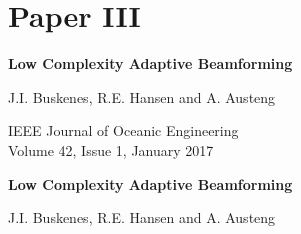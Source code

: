 \ifMonolithic\else\fi


\newif\ifBuildBibliography\BuildBibliographyfalse
\usepackage{subfig}

{}



\ifMonolithic\else
   
\fi




\graphicspath{{../LCAforActiveSonarImaging/submission/final/}}
\ifMonolithic\else\fi
% 
\cleardoublepage
\pagestyle{empty}

{
\setlength\parskip{\baselineskip}
\renewcommand\baselinestretch{1.1}

\chapter{Paper III}\label{ch:paperIII}

{\Large\bf Low Complexity Adaptive Beamforming}

J.I. Buskenes, R.E. Hansen and A. Austeng

IEEE Journal of Oceanic Engineering\\
Volume 42, Issue 1, January 2017%
}


\cleardoublepage
\pagestyle{normal}
\thispagestyle{plain}

\begin{center}
{\Large\bf Low Complexity Adaptive Beamforming}

\vspace{\baselineskip}
J.I. Buskenes, R.E. Hansen and A. Austeng
\end{center}

\overfullrule=1mm
{

   
}
   
% 
% 
%    


\ifMonolithic\else\fi